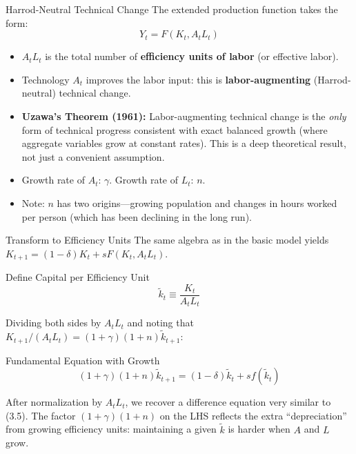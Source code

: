 \documentclass[aspectratio=169,10pt]{beamer}
\newcommand{\apxbutton}[1]{\hfill\hyperlink{#1}{\beamerbutton{Appendix}}}
\begin{document}
\begin{frame}{Harrod-Neutral Technical Change}
The extended production function takes the form:
\[
Y_t = F(K_t, A_t L_t)
\]
\begin{itemize}
  \item $A_t L_t$ is the total number of \textbf{efficiency units of labor} (or effective labor).
  \item Technology $A_t$ improves the labor input: this is \textbf{labor-augmenting} (Harrod-neutral) technical change.
  \item \textbf{Uzawa's Theorem (1961):} Labor-augmenting technical change is the \emph{only} form of technical progress consistent with exact balanced growth (where aggregate variables grow at constant rates). This is a deep theoretical result, not just a convenient assumption.
  \item Growth rate of $A_t$: $\gamma$. Growth rate of $L_t$: $n$.
  \item Note: $n$ has two origins---growing population and changes in hours worked per person (which has been declining in the long run).
\end{itemize}
\end{frame}

\begin{frame}{Transform to Efficiency Units}
\hypertarget{m-a7}{}
The same algebra as in the basic model yields $K_{t+1} = (1-\delta)K_t + sF(K_t, A_tL_t)$.

\begin{block}{Define Capital per Efficiency Unit}
\[
\tilde{k}_t \equiv \frac{K_t}{A_t L_t}
\]
\end{block}
Dividing both sides by $A_tL_t$ and noting that $K_{t+1}/(A_tL_t) = (1+\gamma)(1+n)\tilde{k}_{t+1}$:
\begin{block}{Fundamental Equation with Growth}
\[
(1+\gamma)(1+n)\tilde{k}_{t+1}=(1-\delta)\tilde{k}_t + s f(\tilde{k}_t) \tag{3.7}
\]
\end{block}
After normalization by $A_tL_t$, we recover a difference equation very similar to (3.5). The factor $(1+\gamma)(1+n)$ on the LHS reflects the extra ``depreciation'' from growing efficiency units: maintaining a given $\tilde{k}$ is harder when $A$ and $L$ grow.
\apxbutton{a7}
\end{frame}
\end{document}
